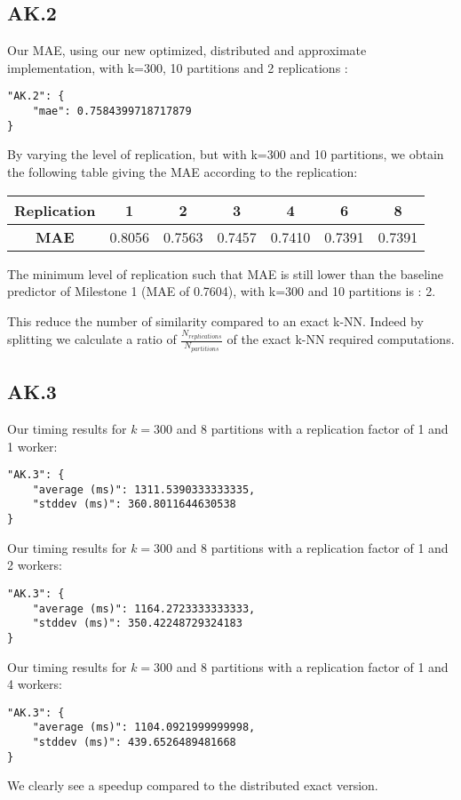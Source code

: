 \documentclass{article}
\begin{document}
\subsection{AK.2}
Our MAE, using our new optimized, distributed and approximate implementation, with k=300, 10 partitions and 2 replications :
\begin{lstlisting}[style=json]
"AK.2": {
    "mae": 0.7584399718717879
}
\end{lstlisting}

By varying the level of replication, but with k=300 and 10 partitions, we obtain the following table giving the MAE according to the replication:
\FloatBarrier
\begin{table}[ht]
\centering
\begin{tabular}{|c|c|c|c|c|c|c|}
\textbf{Replication} & 1 & 2 & 3 & 4 & 6 & 8 \\
\hline
\textbf{MAE} & 0.8056 & 0.7563 & 0.7457 & 0.7410 & 0.7391 & 0.7391\\
\end{tabular}
\label{tbl:results2}
\end{table}
\FloatBarrier

The minimum level of replication such that MAE is still lower than the baseline predictor of Milestone 1 (MAE of 0.7604), with k=300 and 10 partitions is : 2.

This reduce the number of similarity compared to an exact k-NN. Indeed by splitting we calculate a ratio of $\frac{N_{replications}}{N_{partitions}}$ of the exact k-NN required computations.

\subsection{AK.3}
Our timing results for $k=300$ and 8 partitions with a replication factor of 1 and 1 worker:
\begin{lstlisting}[style=json]
"AK.3": {
    "average (ms)": 1311.5390333333335,
    "stddev (ms)": 360.8011644630538
}
\end{lstlisting}
Our timing results for $k=300$ and 8 partitions with a replication factor of 1 and 2 workers:
\begin{lstlisting}[style=json]
"AK.3": {
    "average (ms)": 1164.2723333333333,
    "stddev (ms)": 350.42248729324183
}
\end{lstlisting}
Our timing results for $k=300$ and 8 partitions with a replication factor of 1 and 4 workers:
\begin{lstlisting}[style=json]
"AK.3": {
    "average (ms)": 1104.0921999999998,
    "stddev (ms)": 439.6526489481668
}
\end{lstlisting}
We clearly see a speedup compared to the distributed exact version.
\end{document}
